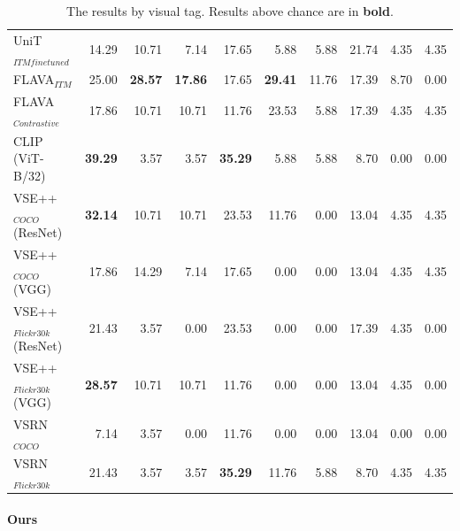 \begin{table}[ht]
\begin{adjustbox}{max width=\textwidth}
\begin{tabular}{l|rrr|rrr|rrr}
 UniT$_{ITM finetuned}$       & 14.29          & 10.71          & 7.14           & 17.65          & 5.88           & 5.88           & 21.74          & 4.35           & 4.35           \\
 FLAVA$_{ITM}$                & 25.00          & \textbf{28.57} & \textbf{17.86} & 17.65          & \textbf{29.41} & 11.76 & 17.39          &  8.70 &  0.00 \\
 FLAVA$_{Contrastive}$        & 17.86          & 10.71          & 10.71          & 11.76          & 23.53          & 5.88           & 17.39          & 4.35           &  4.35 \\
 CLIP (ViT-B/32)              & \textbf{39.29} & 3.57           & 3.57           & \textbf{35.29} & 5.88           & 5.88           & 8.70           & 0.00           & 0.00           \\
 VSE++$_{COCO}$ (ResNet)      & \textbf{32.14} & 10.71          & 10.71          & 23.53          & 11.76          & 0.00           & 13.04          & 4.35           & 4.35           \\
 VSE++$_{COCO}$ (VGG)         & 17.86          & 14.29          & 7.14           & 17.65          & 0.00           & 0.00           & 13.04          & 4.35           & 4.35           \\
 VSE++$_{Flickr30k}$ (ResNet) & 21.43          & 3.57           & 0.00           & 23.53          & 0.00           & 0.00           & 17.39          & 4.35           & 0.00           \\
 VSE++$_{Flickr30k}$ (VGG)    & \textbf{28.57} & 10.71          & 10.71          & 11.76          & 0.00           & 0.00           & 13.04          & 4.35           & 0.00           \\
 VSRN$_{COCO}$                & 7.14           & 3.57           & 0.00           & 11.76          & 0.00           & 0.00           & 13.04          & 0.00           & 0.00           \\
 VSRN$_{Flickr30k}$           & 21.43          & 3.57           & 3.57           & \textbf{35.29} & 11.76          & 5.88           & 8.70           & 4.35           & 4.35           \\
    \bottomrule
  \end{tabular}
  \end{adjustbox}
  \caption{The results by visual tag. Results above chance are in \textbf{bold}.}
    \label{tab:results-by-visual-tag-baseline}
\end{table}

\paragraph{Ours}

